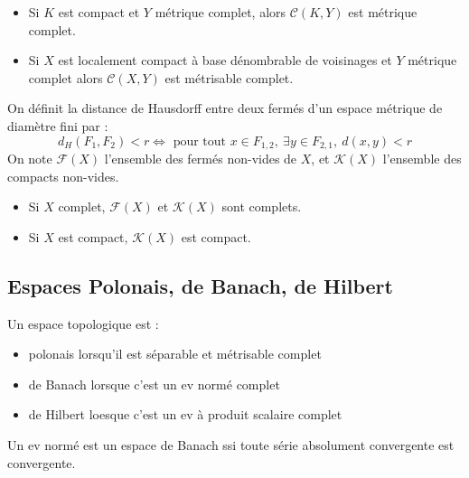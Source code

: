 \documentclass{cours}
\begin{document}
\begin{theorem}
    \begin{itemize}
        \item Si $K$ est compact et $Y$ métrique complet, alors $\mathcal{C}(K, Y)$ est métrique complet.
        \item Si $X$ est localement compact à base dénombrable de voisinages et $Y$ métrique complet alors $\mathcal{C}(X, Y)$ est métrisable complet.
    \end{itemize}
\end{theorem}


\begin{definition}
    On définit la distance de Hausdorff entre deux fermés d'un espace métrique de diamètre fini par :
    \[d_{H}(F_{1}, F_{2}) < r \Leftrightarrow \text{ pour tout } x \in F_{1, 2},\ \exists y \in  F_{2, 1},\ d(x, y) < r\]
    On note $\mathcal{F}(X)$ l'ensemble des fermés non-vides de $X$, et $\mathcal{K}(X)$ l'ensemble des compacts non-vides.
\end{definition}

\begin{theorem}
    \begin{itemize}
        \item Si $X$ complet, $\mathcal{F}(X)$ et $\mathcal{K}(X)$ sont complets.
        \item Si $X$ est compact, $\mathcal{K}(X)$ est compact.
    \end{itemize}
\end{theorem}


\subsection{Espaces Polonais, de Banach, de Hilbert}
\begin{definition}
    Un espace topologique est :
    \begin{itemize}
        \item polonais lorsqu'il est séparable et métrisable complet
        \item de Banach lorsque c'est un ev normé complet
        \item de Hilbert loesque c'est un ev à produit scalaire complet
    \end{itemize}
\end{definition}

\begin{theorem}
    Un ev normé est un espace de Banach ssi toute série absolument convergente est convergente.
\end{theorem}
\end{document}
